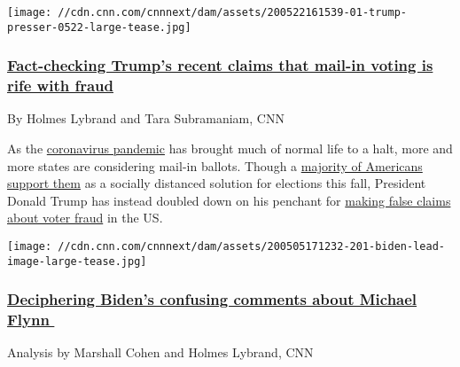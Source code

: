 \href{/2020/05/27/app-politics-section/donald-trump-mail-in-voter-fraud-fact-check/index.html}{}

\texttt{[image: //cdn.cnn.com/cnnnext/dam/assets/200522161539-01-trump-presser-0522-large-tease.jpg]}

\hypertarget{fact-checking-trumps-recent-claims-that-mail-in-voting-is-rife-with-fraud}{%
\subsubsection{\texorpdfstring{\href{/2020/05/27/app-politics-section/donald-trump-mail-in-voter-fraud-fact-check/index.html}{Fact-checking
Trump's recent claims that mail-in voting is rife with
fraud}}{Fact-checking Trump's recent claims that mail-in voting is rife with fraud}}\label{fact-checking-trumps-recent-claims-that-mail-in-voting-is-rife-with-fraud}}

By Holmes Lybrand and Tara Subramaniam, CNN

As the
\href{https://www.cnn.com/us/live-news/us-coronavirus-update-05-27-20/index.html}{coronavirus
pandemic} has brought much of normal life to a halt, more and more
states are considering mail-in ballots. Though a
\href{https://www.cnn.com/2020/04/21/politics/mail-in-voting-partisan-divide/index.html}{majority
of Americans support them} as a socially distanced solution for
elections this fall, President Donald Trump has instead doubled down on
his penchant for
\href{https://www.cnn.com/2020/04/10/politics/fact-check-trump-lying-voter-fraud/index.html}{making
false claims about voter fraud} in the US.

\href{/2020/05/23/politics/joe-biden-comments-on-michael-flynn-donald-trump/index.html}{}

\texttt{[image: //cdn.cnn.com/cnnnext/dam/assets/200505171232-201-biden-lead-image-large-tease.jpg]}

\hypertarget{deciphering-bidens-confusing-comments-about-michael-flynn---}{%
\subsubsection{\texorpdfstring{\href{/2020/05/23/politics/joe-biden-comments-on-michael-flynn-donald-trump/index.html}{Deciphering
Biden's confusing comments about Michael Flynn\,\,
}}{Deciphering Biden's confusing comments about Michael Flynn\,\, }}\label{deciphering-bidens-confusing-comments-about-michael-flynn---}}

Analysis by Marshall Cohen and Holmes Lybrand, CNN

